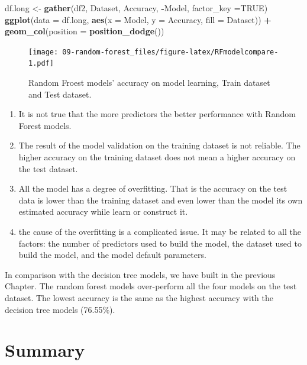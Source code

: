 \documentclass[
]{book}
\newenvironment{Shaded}{\begin{snugshade}}{\end{snugshade}}
\newcommand{\DataTypeTok}[1]{\textcolor[rgb]{0.13,0.29,0.53}{#1}}
\newcommand{\KeywordTok}[1]{\textcolor[rgb]{0.13,0.29,0.53}{\textbf{#1}}}
\newcommand{\NormalTok}[1]{#1}
\newcommand{\OperatorTok}[1]{\textcolor[rgb]{0.81,0.36,0.00}{\textbf{#1}}}
\newcommand{\OtherTok}[1]{\textcolor[rgb]{0.56,0.35,0.01}{#1}}
\newcommand{\StringTok}[1]{\textcolor[rgb]{0.31,0.60,0.02}{#1}}
\providecommand{\tightlist}{%
  \setlength{\itemsep}{0pt}\setlength{\parskip}{0pt}}
\begin{document}
\begin{Shaded}
\begin{Highlighting}[]
\NormalTok{df.long <-}\StringTok{ }\KeywordTok{gather}\NormalTok{(df2, Dataset, Accuracy, }\OperatorTok{-}\NormalTok{Model, }\DataTypeTok{factor_key =}\OtherTok{TRUE}\NormalTok{)}
\KeywordTok{ggplot}\NormalTok{(}\DataTypeTok{data =}\NormalTok{ df.long, }\KeywordTok{aes}\NormalTok{(}\DataTypeTok{x =}\NormalTok{ Model, }\DataTypeTok{y =}\NormalTok{ Accuracy, }\DataTypeTok{fill =}\NormalTok{ Dataset)) }\OperatorTok{+}
\StringTok{  }\KeywordTok{geom_col}\NormalTok{(}\DataTypeTok{position =} \KeywordTok{position_dodge}\NormalTok{()) }
\end{Highlighting}
\end{Shaded}

\begin{figure}
\centering
\texttt{[image: 09-random-forest\_files/figure-latex/RFmodelcompare-1.pdf]}
\caption{\label{fig:RFmodelcompare}Random Froest models' accuracy on model learning, Train dataset and Test dataset.}
\end{figure}

\begin{enumerate}
\def\labelenumi{\arabic{enumi}.}
\tightlist
\item
  It is not true that the more predictors the better performance with Random Forest models.
\item
  The result of the model validation on the training dataset is not reliable. The higher accuracy on the training dataset does not mean a higher accuracy on the test dataset.
\item
  All the model has a degree of overfitting. That is the accuracy on the test data is lower than the training dataset and even lower than the model its own estimated accuracy while learn or construct it.
\item
  the cause of the overfitting is a complicated issue. It may be related to all the factors: the number of predictors used to build the model, the dataset used to build the model, and the model default parameters.
\end{enumerate}

In comparison with the decision tree models, we have built in the previous Chapter. The random forest models over-perform all the four models on the test dataset. The lowest accuracy is the same as the highest accuracy with the decision tree models (76.55\%).

\hypertarget{summary-7}{%
\section*{Summary}\label{summary-7}}
\end{document}
